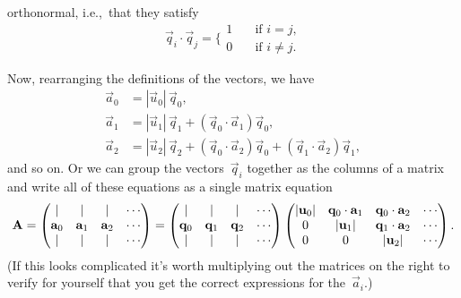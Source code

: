 \documentclass[12pt]{article}
\begin{document}
\begin{exercises}
\begin{enumerate}
  orthonormal, i.e.,~that they satisfy
\begin{displaymath}
\vec{q}_i\cdot\vec{q}_j = \biggl\lbrace\begin{array}{ll}
                            1 & \quad\mbox{if $i=j$,} \\
                            0 & \quad\mbox{if $i\ne j$.}
                          \end{array}
\end{displaymath}
\end{enumerate}
Now, rearranging the definitions of the vectors, we have
\begin{align*}
\vec{a}_0 &= |\vec{u}_0|\,\vec{q}_0, \\
\vec{a}_1 &= |\vec{u}_1|\,\vec{q}_1 + (\vec{q}_0\cdot\vec{a}_1) \vec{q}_0, \\
\vec{a}_2 &= |\vec{u}_2|\,\vec{q}_2 + (\vec{q}_0\cdot\vec{a}_2) \vec{q}_0
              + (\vec{q}_1\cdot\vec{a}_2) \vec{q}_1,
\end{align*}
and so on.  Or we can group the vectors~$\vec{q}_i$ together as the
columns of a matrix and write all of these equations as a single matrix
equation
\begin{displaymath}
\mathbf{A} = \begin{pmatrix}
            | & | & | & \cdots \\
            \mathbf{a}_0 & \mathbf{a}_1 & \mathbf{a}_2 & \cdots \\
            | & | & | & \cdots
          \end{pmatrix}
 =
\begin{pmatrix}
  | & | & | & \cdots \\
  \mathbf{q}_0 & \mathbf{q}_1 & \mathbf{q}_2 & \cdots \\
  | & | & | & \cdots
\end{pmatrix}
\begin{pmatrix}
|\mathbf{u}_0| & \mathbf{q}_0\cdot\mathbf{a}_1 & \mathbf{q}_0\cdot\mathbf{a}_2 & \cdots \\
0           & |\mathbf{u}_1| & \mathbf{q}_1\cdot\mathbf{a}_2 & \cdots \\
0           & 0           & |\mathbf{u}_2| & \cdots
\end{pmatrix}.
\end{displaymath}
(If this looks complicated it's worth multiplying out the matrices on the
right to verify for yourself that you get the correct expressions for
the~$\vec{a}_i$.)


\end{exercises}
\end{document}

